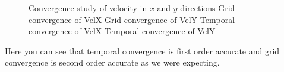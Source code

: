 \documentclass[10pt] {article}
\begin{document}
\begin{figure}[h]
\centering
  \hfill
  \hfill
  \hfill
  \hfill
  \hfill
  \caption{\label{fig:conv} Convergence study of velocity in $x$ and $y$ directions  Grid convergence of VelX  Grid convergence of VelY  Temporal convergence of VelX  Temporal convergence of VelY} 
\end{figure}

Here you can see that temporal convergence is first order accurate and grid convergence is second order accurate as we were expecting.
\clearpage



 
\end{document}
